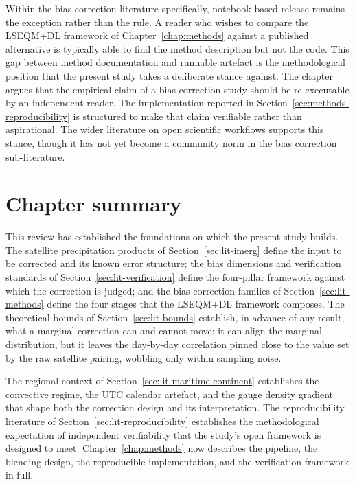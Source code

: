 Within the bias correction literature specifically,
notebook-based release remains the exception rather than the
rule. A reader who wishes to compare the LSEQM+DL framework of
Chapter~\ref{chap:methods} against a published alternative is
typically able to find the method description but not the code.
This gap between method documentation and runnable artefact is
the methodological position that the present study takes a
deliberate stance against. The chapter argues that the empirical
claim of a bias correction study should be re-executable by an
independent reader. The implementation reported in
Section~\ref{sec:methods-reproducibility} is structured to make
that claim verifiable rather than aspirational. The wider
literature on open scientific workflows
\citep{ref:wilkinson2016, ref:giuliani2019} supports this stance,
though it has not yet become a community norm in the bias
correction sub-literature.


\section*{Chapter summary}

This review has established the foundations on which the present
study builds. The satellite precipitation products of
Section~\ref{sec:lit-imerg} define the input to be corrected and
its known error structure; the bias dimensions and verification
standards of Section~\ref{sec:lit-verification} define the
four-pillar framework against which the correction is judged; and
the bias correction families of Section~\ref{sec:lit-methods}
define the four stages that the LSEQM+DL framework composes. The
theoretical bounds of Section~\ref{sec:lit-bounds} establish, in
advance of any result, what a marginal correction can and cannot
move: it can align the marginal distribution, but it leaves the
day-by-day correlation pinned close to the value set by the raw
satellite pairing, wobbling only within sampling noise.

The regional context of
Section~\ref{sec:lit-maritime-continent} establishes the
convective regime, the UTC calendar artefact, and the gauge
density gradient that shape both the correction design and its
interpretation. The reproducibility literature of
Section~\ref{sec:lit-reproducibility} establishes the
methodological expectation of independent verifiability that the
study's open framework is designed to meet. Chapter~\ref{chap:methods} now describes the
pipeline, the blending design, the reproducible implementation,
and the verification framework in full.
